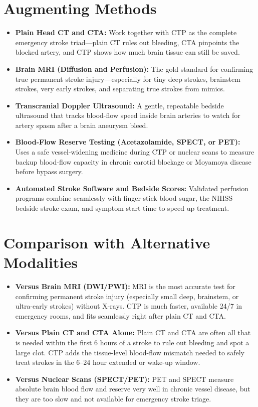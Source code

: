 \section{Augmenting Methods}
\begin{itemize}
    \item \textbf{Plain Head CT and CTA:} Work together with CTP as the complete emergency stroke triad---plain CT rules out bleeding, CTA pinpoints the blocked artery, and CTP shows how much brain tissue can still be saved.
    \item \textbf{Brain MRI (Diffusion and Perfusion):} The gold standard for confirming true permanent stroke injury---especially for tiny deep strokes, brainstem strokes, very early strokes, and separating true strokes from mimics.
    \item \textbf{Transcranial Doppler Ultrasound:} A gentle, repeatable bedside ultrasound that tracks blood-flow speed inside brain arteries to watch for artery spasm after a brain aneurysm bleed.
    \item \textbf{Blood-Flow Reserve Testing (Acetazolamide, SPECT, or PET):} Uses a safe vessel-widening medicine during CTP or nuclear scans to measure backup blood-flow capacity in chronic carotid blockage or Moyamoya disease before bypass surgery.
    \item \textbf{Automated Stroke Software and Bedside Scores:} Validated perfusion programs combine seamlessly with finger-stick blood sugar, the NIHSS bedside stroke exam, and symptom start time to speed up treatment.
\end{itemize}

\section{Comparison with Alternative Modalities}
\begin{itemize}
    \item \textbf{Versus Brain MRI (DWI/PWI):} MRI is the most accurate test for confirming permanent stroke injury (especially small deep, brainstem, or ultra-early strokes) without X-rays. CTP is much faster, available 24/7 in emergency rooms, and fits seamlessly right after plain CT and CTA.
    \item \textbf{Versus Plain CT and CTA Alone:} Plain CT and CTA are often all that is needed within the first 6 hours of a stroke to rule out bleeding and spot a large clot. CTP adds the tissue-level blood-flow mismatch needed to safely treat strokes in the 6--24 hour extended or wake-up window.
    \item \textbf{Versus Nuclear Scans (SPECT/PET):} PET and SPECT measure absolute brain blood flow and reserve very well in chronic vessel disease, but they are too slow and not available for emergency stroke triage.
\end{itemize}

